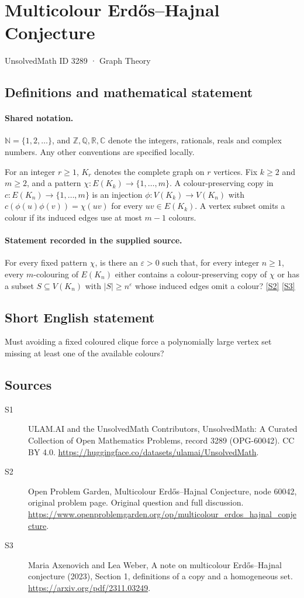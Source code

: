 \documentclass[11pt]{article}
\newcommand{\sref}[2]{\hyperlink{source:#1:#2}{[S#2]}}
\begin{document}
\setcounter{section}{3288}
\section{Multicolour Erdős--Hajnal Conjecture}\label{3289}
{\small\sffamily UnsolvedMath ID 3289 · Graph Theory}
\subsection{Definitions and mathematical statement}

\paragraph{Shared notation.}$\mathbb N=\{1,2,\ldots\}$, and $\mathbb Z,\mathbb Q,\mathbb R,\mathbb C$ denote the integers, rationals, reals and complex numbers. Any other conventions are specified locally.


For an integer $r\geq1$, $K_r$ denotes the complete graph on $r$ vertices. Fix $k\geq2$ and $m\geq2$, and a pattern $\chi:E(K_k)\to\{1,\ldots,m\}$. A colour-preserving copy in $c:E(K_n)\to\{1,\ldots,m\}$ is an injection $\phi:V(K_k)\to V(K_n)$ with $c(\phi(u)\phi(v))=\chi(uv)$ for every $uv\in E(K_k)$. A vertex subset omits a colour if its induced edges use at most $m-1$ colours.
\paragraph{Statement recorded in the supplied source.}
For every fixed pattern $\chi$, is there an $\varepsilon>0$ such that, for every integer $n\geq1$, every $m$-colouring of $E(K_n)$ either contains a colour-preserving copy of $\chi$ or has a subset $S\subseteq V(K_n)$ with $|S|\geq n^\varepsilon$ whose induced edges omit a colour? \sref{3289}{2} \sref{3289}{3}
\subsection{Short English statement}
Must avoiding a fixed coloured clique force a polynomially large vertex set missing at least one of the available colours?
\subsection{Sources}
\begin{description}
\item[\hypertarget{source:3289:1}{S1}] ULAM.AI and the UnsolvedMath Contributors, UnsolvedMath: A Curated Collection of Open Mathematics Problems, record 3289 (OPG-60042). CC BY 4.0. \url{https://huggingface.co/datasets/ulamai/UnsolvedMath}.
\item[\hypertarget{source:3289:2}{S2}] Open Problem Garden, Multicolour Erdős--Hajnal Conjecture, node 60042, original problem page. Original question and full discussion. \url{https://www.openproblemgarden.org/op/multicolour_erdos_hajnal_conjecture}.
\item[\hypertarget{source:3289:3}{S3}] Maria Axenovich and Lea Weber, A note on multicolour Erdős--Hajnal conjecture (2023), Section 1, definitions of a copy and a homogeneous set. \url{https://arxiv.org/pdf/2311.03249}.
\end{description}
\label{end:3289}
\end{document}
